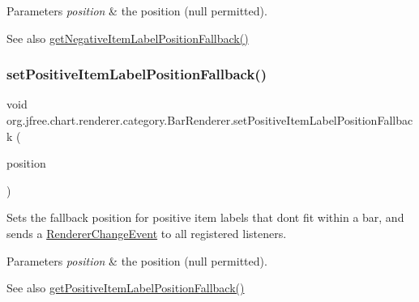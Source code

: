 \begin{DoxyParams}{Parameters}
{\em position} & the position ({\ttfamily null} permitted).\\
\hline
\end{DoxyParams}
\begin{DoxySeeAlso}{See also}
\mbox{\hyperlink{classorg_1_1jfree_1_1chart_1_1renderer_1_1category_1_1_bar_renderer_a469ad73ef3d9788fc935bb3df23e3f19}{get\+Negative\+Item\+Label\+Position\+Fallback()}} 
\end{DoxySeeAlso}
\mbox{\label{classorg_1_1jfree_1_1chart_1_1renderer_1_1category_1_1_bar_renderer_a2e03b899d718a6329c5ca2096704c937}} 
\subsubsection{\texorpdfstring{set\+Positive\+Item\+Label\+Position\+Fallback()}{setPositiveItemLabelPositionFallback()}}
{\footnotesize\ttfamily void org.\+jfree.\+chart.\+renderer.\+category.\+Bar\+Renderer.\+set\+Positive\+Item\+Label\+Position\+Fallback (\begin{DoxyParamCaption}\item[{\mbox{\hyperlink{classorg_1_1jfree_1_1chart_1_1labels_1_1_item_label_position}{Item\+Label\+Position}}}]{position }\end{DoxyParamCaption})}

Sets the fallback position for positive item labels that don\textquotesingle{}t fit within a bar, and sends a \mbox{\hyperlink{}{Renderer\+Change\+Event}} to all registered listeners.


\begin{DoxyParams}{Parameters}
{\em position} & the position ({\ttfamily null} permitted).\\
\hline
\end{DoxyParams}
\begin{DoxySeeAlso}{See also}
\mbox{\hyperlink{classorg_1_1jfree_1_1chart_1_1renderer_1_1category_1_1_bar_renderer_ab0ba3e927e89df53d9585f80b2a67222}{get\+Positive\+Item\+Label\+Position\+Fallback()}} 
\end{DoxySeeAlso}
\mbox{\label{classorg_1_1jfree_1_1chart_1_1renderer_1_1category_1_1_bar_renderer_a374cb539bacc8cfffc407bae73a38d6d}} 
